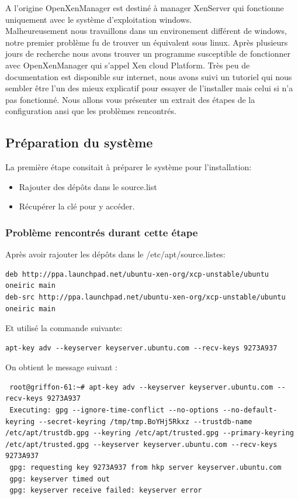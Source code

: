 A l'origine OpenXenManager est destiné à manager XenServer qui fonctionne uniquement avec le système d'exploitation windows.\\Malheureusement nous travaillons dans un environement différent de windows, notre premier problème fu de trouver un équivalent sous linux.
Après plusieurs jours de recherche nous avons trouver un programme susceptible de fonctionner avec OpenXenManager qui s'appel Xen cloud Platform.
Très peu de documentation est disponible sur internet, nous avons suivi un tutoriel qui nous sembler être l'un des mieux explicatif pour essayer de l'installer mais celui si n'a pas fonctionné.
Nous allons vous présenter un extrait des étapes de la configuration ansi que les problèmes rencontrés.
\subsection{Préparation du système}
La première étape consitait à préparer le système pour l'installation:
\begin{itemize}
\item Rajouter des dépôts dans le source.list
\item Récupérer la clé pour y accéder.
\end{itemize}

\subsubsection{Problème rencontrés durant cette étape}

Après avoir rajouter les dépôts dans le /etc/apt/source.listes:

\begin{lstlisting}
deb http://ppa.launchpad.net/ubuntu-xen-org/xcp-unstable/ubuntu oneiric main 
deb-src http://ppa.launchpad.net/ubuntu-xen-org/xcp-unstable/ubuntu oneiric main
\end{lstlisting}
Et utilisé la commande suivante:
\begin{lstlisting}
apt-key adv --keyserver keyserver.ubuntu.com --recv-keys 9273A937
\end{lstlisting}

On obtient le message suivant :

\begin{lstlisting}
 root@griffon-61:~# apt-key adv --keyserver keyserver.ubuntu.com --recv-keys 9273A937
 Executing: gpg --ignore-time-conflict --no-options --no-default-keyring --secret-keyring /tmp/tmp.BoYHj5Rkxz --trustdb-name /etc/apt/trustdb.gpg --keyring /etc/apt/trusted.gpg --primary-keyring /etc/apt/trusted.gpg --keyserver keyserver.ubuntu.com --recv-keys 9273A937
 gpg: requesting key 9273A937 from hkp server keyserver.ubuntu.com
 gpg: keyserver timed out
 gpg: keyserver receive failed: keyserver error
\end{lstlisting}

